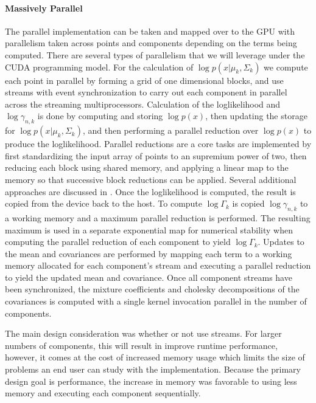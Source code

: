 \documentclass{article}
\begin{document}
\paragraph{Massively Parallel} The parallel implementation can be taken and mapped over to the GPU with parallelism taken across points and components depending on the terms being computed. There are several types of parallelism that we will leverage under the CUDA programming model. For the calculation of $\log p\left(x | \mu_k, \Sigma_k \right)$ we compute each point in parallel by forming a grid of one dimensional blocks, and use streams with event synchronization to carry out each component in parallel across the streaming multiprocessors. Calculation of the loglikelihood and $\log \gamma_{n,k}$ is done by computing and storing $\log p(x)$, then updating the storage for $\log p\left(x|\mu_k,\Sigma_k\right)$, and then performing a parallel reduction over $\log p(x)$ to produce the loglikelihood. Parallel reductions are a core tasks are implemented by first standardizing the input array of points to an supremium power of two, then reducing each block using shared memory, and applying a linear map to the memory so that successive block reductions can be applied. Several additional approaches are discussed in \cite{harris2007optimizing}. Once the loglikelihood is computed, the result is copied from the device back to the host. To compute $\log \Gamma_k$ is copied $\log \gamma_{n,k}$ to a working memory and a maximum parallel reduction is performed. The resulting maximum is used in a separate exponential map for numerical stability when computing the parallel reduction of each component to yield $\log \Gamma_k$. Updates to the mean and covariances are performed by mapping each term to a working memory allocated for each component's stream and executing a parallel reduction to yield the updated mean and covariance. Once all component streams have been synchronized, the mixture coefficients and cholesky decompositions of the covariances is computed with a single kernel invocation parallel in the number of components.

The main design consideration was whether or not use streams. For larger numbers of components, this will result in improve runtime performance, however, it comes at the cost of increased memory usage which limits the size of problems an end user can study with the implementation. Because the primary design goal is performance, the increase in memory was favorable to using less memory and executing each component sequentially.
\end{document}
